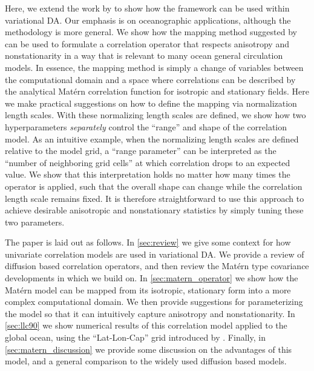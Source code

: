 Here, we extend the work by 
to show how the framework can be used within variational DA.
Our emphasis is on oceanographic applications, although the methodology is more
general.
We show how the mapping method suggested by 
can be used to formulate a correlation operator that respects anisotropy and
nonstationarity in a way that is relevant to many ocean general circulation
models.
In essence, the mapping method is simply a change of variables between the
computational domain and a space
where correlations can be described by the analytical Mat\'ern
correlation function for isotropic and stationary fields.
Here we make practical suggestions on how to define the mapping via normalization
length scales.
With these normalizing length scales are defined, we show how two
hyperparameters \textit{separately} control the ``range'' and shape of the
correlation model.
As an intuitive example, when the normalizing length scales are defined relative
to the model grid, a ``range parameter'' can be interpreted as the ``number of
neighboring grid cells'' at which correlation drops to an expected value.
We show that this interpretation holds no matter how many times the operator is
applied, such that the overall shape can change while the
correlation length scale remains fixed.
It is therefore straightforward to use this approach to achieve desirable
anisotropic and nonstationary statistics by simply tuning these two
parameters.

The paper is laid out as follows.
In \cref{sec:review} we give some context for how univariate correlation models
are used in variational DA.
We provide a review of diffusion based correlation operators, and
then review the Mat\'ern type covariance developments in 
which we build on.
In \cref{sec:matern_operator} we show how the Mat\'ern model can be mapped from
its isotropic, stationary form into a more complex computational domain.
We then provide suggestions for parameterizing the model so that it can
intuitively capture anisotropy and nonstationarity.
In \cref{sec:llc90} we show numerical results of this correlation model
applied to the global ocean, using the ``Lat-Lon-Cap'' grid introduced by
\citet{forgetECCOv4}.
Finally, in \cref{sec:matern_discussion} we provide some discussion on the
advantages of this model, and a general comparison to the widely used
diffusion based models.
